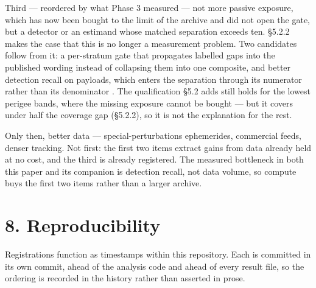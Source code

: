 \documentclass[11pt]{article}
\begin{document}
Third --- reordered by what Phase 3 measured --- not more passive exposure, which has now been bought to the limit of the archive and did not open the gate, but a detector or an estimand whose matched separation exceeds ten. \S{}5.2.2 makes the case that this is no longer a measurement problem. Two candidates follow from it: a per-stratum gate that propagates labelled gaps into the published wording instead of collapsing them into one composite, and better detection recall on payloads, which enters the separation through its numerator rather than its denominator%
. The qualification \S{}5.2 adds still holds for the lowest perigee bands, where the missing exposure cannot be bought --- but it covers under half the coverage gap (\S{}5.2.2), so it is not the explanation for the rest.

Only then, better data --- special-perturbations ephemerides, commercial feeds, denser tracking. Not first: the first two items extract gains from data already held at no cost, and the third is already registered. The measured bottleneck in both this paper and its companion is detection recall, not data volume, so compute buys the first two items rather than a larger archive.

\section*{8. Reproducibility}

Registrations function as timestamps within this repository. Each is committed in its own commit, ahead of the analysis code and ahead of every result file, so the ordering is recorded in the history rather than asserted in prose.
\end{document}
